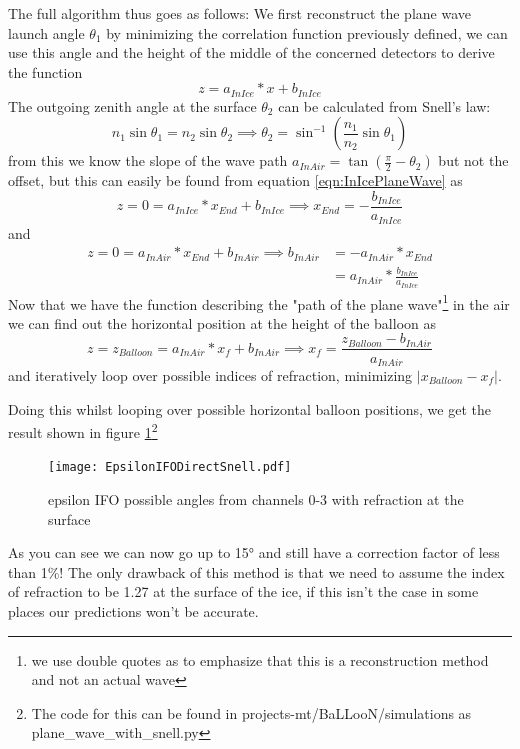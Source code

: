 The full algorithm thus goes as follows: We first reconstruct the
plane wave launch angle $\theta_1$ by minimizing the correlation function
previously defined, we can use this angle and the height of the middle of the
concerned detectors to derive the function
\begin{equation}
	z = a_{InIce}*x + b_{InIce}
	\label{eqn:InIcePlaneWave}
\end{equation}
The outgoing zenith angle at the surface $\theta_2$ can be calculated from Snell's law:
\begin{equation}
n_1 \sin{\theta_1} = n_2 \sin{\theta_2} \implies  \theta_2 = \sin^{-1}\left(\frac{n_1}{n_2}\sin{\theta_1}\right)
\end{equation}
from this we know the slope of the wave path $a_{InAir} = \tan\left({\frac{\pi}{2} -
\theta_2}\right)$ but not the offset, but this can easily be found from equation
\ref{eqn:InIcePlaneWave} as 
\begin{equation}
	z = 0 = a_{InIce}*x_{End} + b_{InIce} \implies x_{End} = -\frac{b_{InIce}}{a_{InIce}}
\end{equation}
and 
\begin{align}
	z = 0 = a_{InAir}*x_{End} + b_{InAir} \implies b_{InAir} &= -a_{InAir}*x_{End}
	\\&= a_{InAir}* \frac{b_{InIce}}{a_{InIce}}
\end{align}
Now that we have the function describing the "path of the plane wave"\footnote{we use double
quotes as to emphasize that this is a reconstruction method and not an actual wave} in the air 
we can find out the horizontal position at the height of the balloon as
\begin{equation}
	z = z_{Balloon} = a_{InAir}*x_{f} + b_{InAir} \implies x_f = \frac{z_{Balloon} - b_{InAir}}{a_{InAir}}
\end{equation}
and iteratively loop over possible indices of refraction, minimizing $|x_{Balloon} - x_f|$.

Doing this whilst looping over possible horizontal balloon positions, we get
the result shown in figure \ref{fig:EpsilonIFODirectSnell}\footnote{The code
for this can be found in projects-mt/BaLLooN/simulations as
plane\_wave\_with\_snell.py}
\begin{figure}
	\centering
	\texttt{[image: EpsilonIFODirectSnell.pdf]}
	\caption{epsilon IFO possible angles from channels 0-3 with refraction at the surface}
	\label{fig:EpsilonIFODirectSnell}
\end{figure}
As you can see we can now go up to 15° and still have a correction factor of less than 1\%!  The
only drawback of this method is that we need to assume the index of refraction
to be 1.27 at the surface of the ice, if this isn't the case in some places our
predictions won't be accurate.


